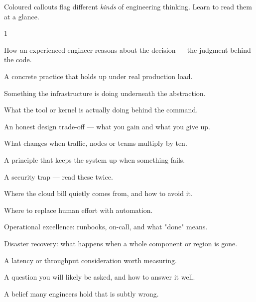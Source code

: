 
Coloured callouts flag different \emph{kinds} of engineering thinking. Learn to read them at a glance.

\begin{multicols}{1}
\begin{seniornote}How an experienced engineer reasons about the decision --- the judgment behind the code.\end{seniornote}
\begin{prodtip}A concrete practice that holds up under real production load.\end{prodtip}
\begin{infranote}Something the infrastructure is doing underneath the abstraction.\end{infranote}
\begin{behind}What the tool or kernel is actually doing behind the command.\end{behind}
\begin{tradeoff}An honest design trade-off --- what you gain and what you give up.\end{tradeoff}
\begin{scalenote}What changes when traffic, nodes or teams multiply by ten.\end{scalenote}
\begin{reliability}A principle that keeps the system up when something fails.\end{reliability}
\begin{secwarn}A security trap --- read these twice.\end{secwarn}
\begin{costnote}Where the cloud bill quietly comes from, and how to avoid it.\end{costnote}
\begin{autotip}Where to replace human effort with automation.\end{autotip}
\begin{opsnote}Operational excellence: runbooks, on-call, and what "done" means.\end{opsnote}
\begin{drtip}Disaster recovery: what happens when a whole component or region is gone.\end{drtip}
\begin{perfnote}A latency or throughput consideration worth measuring.\end{perfnote}
\begin{interview}A question you will likely be asked, and how to answer it well.\end{interview}
\begin{misconception}A belief many engineers hold that is subtly wrong.\end{misconception}
\end{multicols}

